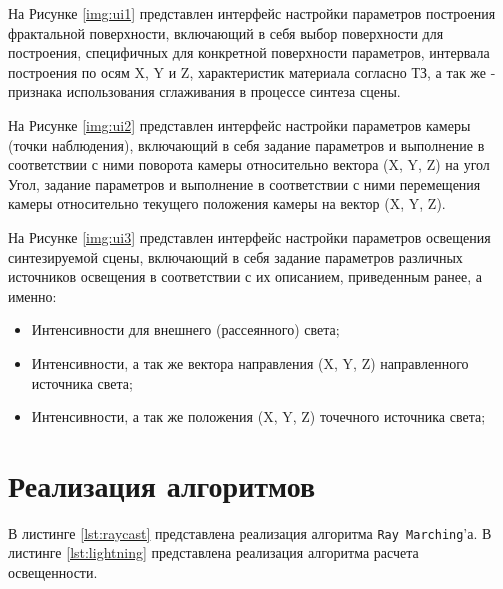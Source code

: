 
На Рисунке \ref{img:ui1} представлен интерфейс настройки параметров построения фрактальной поверхности, включающий в себя выбор поверхности для построения, специфичных для конкретной поверхности параметров, интервала построения по осям X, Y и Z, характеристик материала согласно ТЗ, а так же - признака использования сглаживания в процессе синтеза сцены.
\clearpage


На Рисунке \ref{img:ui2} представлен интерфейс настройки параметров камеры (точки наблюдения), включающий в себя задание параметров и выполнение в соответствии с ними поворота камеры относительно вектора (X, Y, Z) на угол Угол, задание параметров и выполнение в соответствии с ними перемещения камеры относительно текущего положения камеры на вектор (X, Y, Z).

\clearpage
{}

На Рисунке \ref{img:ui3} представлен интерфейс настройки параметров освещения синтезируемой сцены, включающий в себя задание параметров различных источников освещения в соответствии с их описанием, приведенным ранее, а именно:
\begin{itemize}
    \item Интенсивности для внешнего (рассеянного) света;
    \item Интенсивности, а так же вектора направления (X, Y, Z) направленного источника света;
    \item Интенсивности, а так же положения (X, Y, Z) точечного источника света;
\end{itemize}

\section{Реализация алгоритмов}

В листинге \ref{lst:raycast} представлена реализация алгоритма \texttt{Ray Marching}'а. В листинге \ref{lst:lightning} представлена реализация алгоритма расчета освещенности.

\clearpage

\clearpage

